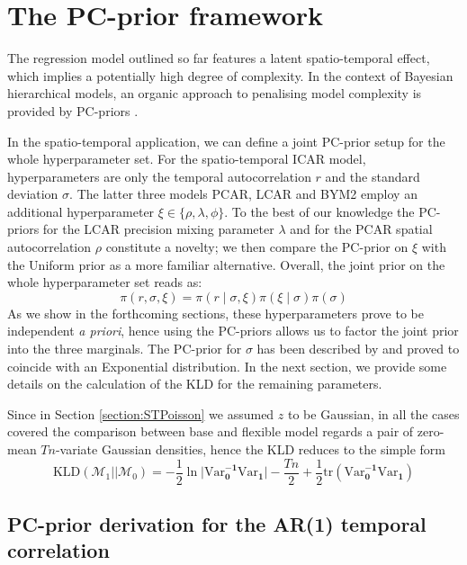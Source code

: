 \documentclass[openany, 11pt, oneside]{book}
\begin{document}
\section{The PC-prior framework} \label{section:PC_VAW}

The regression model outlined so far features a latent spatio-temporal effect, which implies a potentially high degree of complexity. In the context of Bayesian hierarchical models, an organic approach to penalising model complexity is provided by PC-priors \parencite[][a short overview of PC-priors is in Section \ref{section:PC_INLA}]{PC}.

In the spatio-temporal application, we can define a joint PC-prior setup for the whole hyperparameter set. For the spatio-temporal ICAR model, hyperparameters are only the temporal autocorrelation $r$ and the standard deviation $\sigma$. The latter three models PCAR, LCAR and BYM2 employ an additional hyperparameter $\xi \in \lbrace \rho, \lambda, \phi \rbrace$. 
To the best of our knowledge the PC-priors for the LCAR precision mixing parameter $\lambda$ and for the PCAR spatial autocorrelation $\rho$ constitute a novelty; we then compare the PC-prior on $\xi$ with the Uniform prior as a more familiar alternative. Overall, the joint prior on the whole hyperparameter set reads as:
$$
\pi(r, \sigma, \xi) =\pi(r \mid \sigma, \xi) \pi(\xi\mid\sigma) \pi(\sigma)
$$
As we show in the forthcoming sections, these hyperparameters prove to be independent \textit{a priori}, hence using the PC-priors allows us to factor the joint prior into the three marginals.  The PC-prior for $\sigma$ has been described by \cite{PC} and proved to coincide with an Exponential distribution. In the next section, we provide some details on the calculation of the KLD for the remaining parameters.

Since in Section \ref{section:STPoisson} we assumed $z$ to be Gaussian, in all the cases covered the comparison between base and flexible model regards a pair of zero-mean $Tn$-variate Gaussian densities, hence the KLD reduces to the simple form \parencite{PC}
\begin{equation}
\mathrm{KLD}(\mathcal{M}_1 \lvert \rvert \mathcal{M}_{0}) = 
-\frac{1}{2} \ln \lvert \boldsymbol{\mathrm{Var}_{0}^{-1} \mathrm{Var}_{1}}  \rvert
- \frac{Tn}{2}
+ \frac{1}{2} \mathrm{tr}\left( \boldsymbol{\mathrm{Var}_{0}^{-1} \mathrm{Var}_{1}} \right)
\label{eq:KLD_norm}
\end{equation}

\subsection{PC-prior derivation for the AR(1) temporal correlation}
\end{document}
